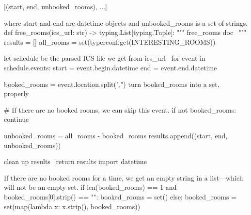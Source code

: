 [(start, end, unbooked_rooms), ...]

where start and end are datetime objects and unbooked_rooms is a set of 
strings.
\nwendcode{}\endmoddef\nwstartdeflinemarkup{}\nwenddeflinemarkup
def free_rooms(ics_url: str) -> typing.List[typing.Tuple]:
  """
  \LA{}\code{}free{\_}rooms\edoc{} doc~{\nwtagstyle{}}\RA{}
  """
  results = []
  all_rooms = set(typerconf.get(INTERESTING_ROOMS))

  \LA{}let \code{}schedule\edoc{} be the parsed ICS file we get from \code{}ics{\_}url\edoc{}~{\nwtagstyle{}}\RA{}
  for event in schedule.events:
    start = event.begin.datetime
    end = event.end.datetime

    booked_rooms = event.location.split(",")
    \LA{}turn \code{}booked{\_}rooms\edoc{} into a set, properly~{\nwtagstyle{}}\RA{}

    # If there are no booked rooms, we can skip this event.
    if not booked_rooms:
      continue

    unbooked_rooms = all_rooms - booked_rooms
    results.append((start, end, unbooked_rooms))

  \LA{}clean up \code{}results\edoc{}~{\nwtagstyle{}}\RA{}
  return results
\nwendcode{}\endmoddef\nwstartdeflinemarkup{}\nwenddeflinemarkup
import datetime
\nwendcode{}\nwdocspar

If there are no booked rooms for a time, we get an empty string in a 
list---which will not be an empty set.
\nwenddocs{}\endmoddef\nwstartdeflinemarkup{}\nwenddeflinemarkup
if len(booked_rooms) == 1 and booked_rooms[0].strip() == "":
  booked_rooms = set()
else:
  booked_rooms = set(map(lambda x: x.strip(), booked_rooms))
\nwendcode{}\nwdocspar


